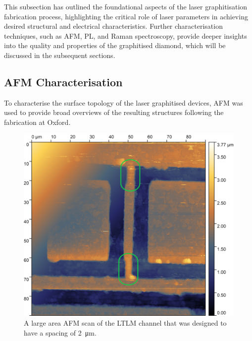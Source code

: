 \begin{refsection}
This subsection has outlined the foundational aspects of the laser graphitisation fabrication process, highlighting the critical role of laser parameters in achieving desired structural and electrical characteristics. Further characterisation techniques, such as AFM, PL, and Raman spectroscopy, provide deeper insights into the quality and properties of the graphitised diamond, which will be discussed in the subsequent sections.

\subsection{AFM Characterisation}
\label{subsec:afm_characterisation}
To characterise the surface topology of the laser graphitised devices, AFM was used to provide broad overviews of the resulting structures following the fabrication at Oxford. 

\begin{figure}[H]
    \centering
    \includegraphics[width=\textwidth]{Chapter7/Figs/Raster/21 meh 4k_white_annotated_downscaled.jpg}
    \caption{A large area AFM scan of the LTLM channel that was designed to have a spacing of 2~\si{\micro\metre}.}
    \label{fig:afm_21_big}
\end{figure}


\end{refsection}
